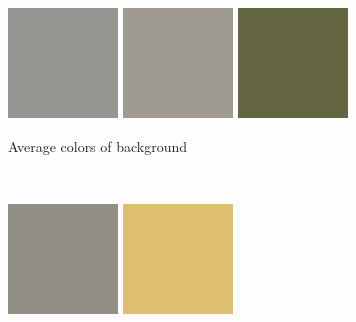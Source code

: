 \documentclass[a4paper]{article}
\begin{document}
\begin{figure}[ht]
	
	\vspace{2mm}
	\begin{subfigure}[h]{0.48\textwidth}
	\centering
	\includegraphics[width=0.32\textwidth]{imgs/backgroundMean1_cars.png}
	\includegraphics[width=0.32\textwidth]{imgs/backgroundMean2_cars.png}
	\includegraphics[width=0.32\textwidth]{imgs/backgroundMean3_cars.png}
	\caption*{Average colors of background}
	\end{subfigure}
	~
    	\vspace{2mm}
	\begin{subfigure}[h]{0.48\textwidth}
	\centering
	\includegraphics[width=0.32\textwidth]{imgs/foregroundMean1_cars.png}
	\includegraphics[width=0.32\textwidth]{imgs/foregroundMean2_cars.png}

\end{subfigure}
\end{figure}
\end{document}
